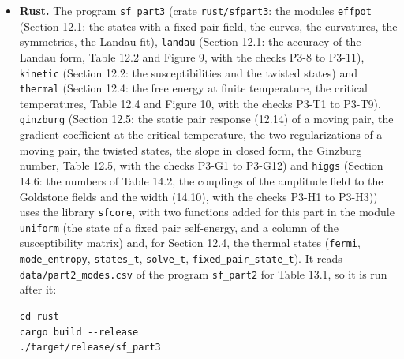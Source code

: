\documentclass[
  10pt,
]{article}
\begin{document}
\begin{itemize}
\item
  \textbf{Rust.} The program \texttt{sf\_part3} (crate
  \texttt{rust/sfpart3}: the modules \texttt{effpot} (Section 12.1: the
  states with a fixed pair field, the curves, the curvatures, the
  symmetries, the Landau fit), \texttt{landau} (Section 12.1: the
  accuracy of the Landau form, Table 12.2 and Figure 9, with the checks
  P3-8 to P3-11), \texttt{kinetic} (Section 12.2: the susceptibilities
  and the twisted states) and \texttt{thermal} (Section 12.4: the free
  energy at finite temperature, the critical temperatures, Table 12.4
  and Figure 10, with the checks P3-T1 to P3-T9), \texttt{ginzburg}
  (Section 12.5: the static pair response (12.14) of a moving pair, the
  gradient coefficient at the critical temperature, the two
  regularizations of a moving pair, the twisted states, the slope in
  closed form, the Ginzburg number, Table 12.5, with the checks P3-G1 to
  P3-G12) and \texttt{higgs} (Section 14.6: the numbers of Table 14.2,
  the couplings of the amplitude field to the Goldstone fields and the
  width (14.10), with the checks P3-H1 to P3-H3)) uses the library
  \texttt{sfcore}, with two functions added for this part in the module
  \texttt{uniform} (the state of a fixed pair self-energy, and a column
  of the susceptibility matrix) and, for Section 12.4, the thermal
  states (\texttt{fermi}, \texttt{mode\_entropy}, \texttt{states\_t},
  \texttt{solve\_t}, \texttt{fixed\_pair\_state\_t}). It reads
  \texttt{data/part2\_modes.csv} of the program \texttt{sf\_part2} for
  Table 13.1, so it is run after it:

\begin{verbatim}
cd rust
cargo build --release
./target/release/sf_part3
\end{verbatim}


\end{itemize}
\end{document}
